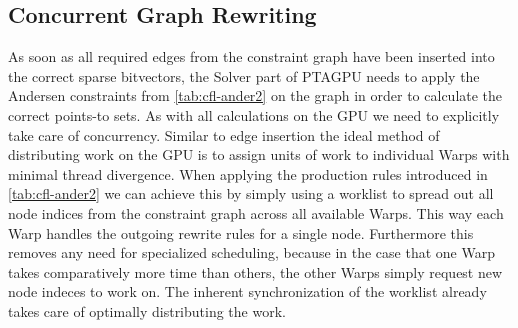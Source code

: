 \subsection{Concurrent Graph Rewriting}\label{sec:concurrgraph}
As soon as all required edges from the constraint graph have been inserted into the correct sparse bitvectors, the Solver part of PTAGPU needs to apply the Andersen constraints from \autoref{tab:cfl-ander2} on the graph in order to calculate the correct points-to sets.
As with all calculations on the GPU we need to explicitly take care of concurrency.
Similar to edge insertion the ideal method of distributing work on the GPU is to assign units of work to individual Warps with minimal thread divergence.
When applying the production rules introduced in \autoref{tab:cfl-ander2} we can achieve this by simply using a worklist to spread out all node indices from the constraint graph across all available Warps.
This way each Warp handles the outgoing rewrite rules for a single node.
Furthermore this removes any need for specialized scheduling, because in the case that one Warp takes comparatively more time than others, the other Warps simply request new node indeces to work on.
The inherent synchronization of the worklist already takes care of optimally distributing the work.

